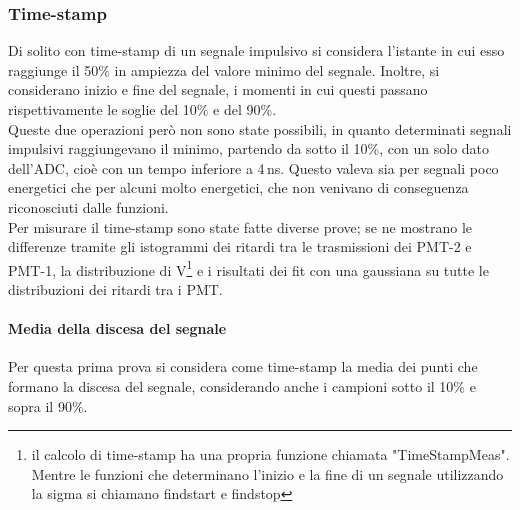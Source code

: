 \documentclass[a4paper,twocolumn]{article}
\begin{document}
\subsubsection{Time-stamp}
Di solito con time-stamp di un segnale impulsivo si considera l'istante in cui esso raggiunge il 50$\%$ in ampiezza del valore minimo del segnale. Inoltre, si considerano inizio e fine del segnale, i momenti in cui  questi passano rispettivamente le soglie del 10$\%$ e del 90$\%$.\\
Queste due operazioni però non sono state possibili, in quanto determinati segnali impulsivi raggiungevano il minimo, partendo da sotto il 10$\%$, con un solo dato dell'ADC, cioè con un tempo inferiore a 4\,ns. Questo valeva sia per segnali poco energetici che per alcuni molto energetici, che non venivano di conseguenza riconosciuti dalle funzioni.\\
Per misurare il time-stamp sono state fatte diverse prove; se ne mostrano le differenze tramite gli istogrammi dei ritardi tra le trasmissioni dei PMT-2 e PMT-1, la distribuzione di V\footnote{il calcolo di time-stamp ha una propria funzione chiamata "TimeStampMeas". Mentre le funzioni che determinano l'inizio e la fine di un segnale utilizzando la sigma si chiamano findstart e findstop} e i risultati dei fit con una gaussiana su tutte le distribuzioni dei ritardi tra i PMT.

\paragraph{Media della discesa del segnale}
Per questa prima prova si considera come time-stamp la media dei punti che formano la discesa del segnale, considerando anche i campioni sotto il 10$\%$ e sopra il 90$\%$.
\end{document}
